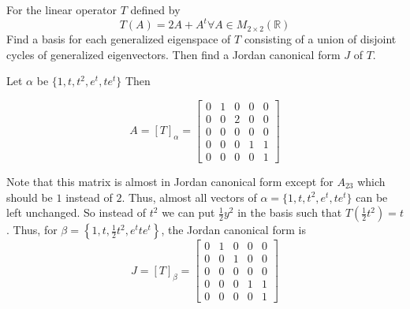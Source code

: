 \begin{homeworkProblem}

For the linear operator $T$ defined by
\[
  T(A) = 2A + A^t \forall A \in M_{2 \times 2}(\mathbb{R})
\]
Find a basis for each generalized eigenspace of $T$ consisting of a union of disjoint cycles of generalized eigenvectors. Then find a Jordan canonical form $J$ of $T$.

\solution

Let $\alpha$ be $\{1, t, t^2, e^t, te^t\}$ Then

\[
  A = [T]_{\alpha} = \begin{bmatrix}
    0 & 1 & 0 & 0 & 0 \\
    0 & 0 & 2 & 0 & 0 \\
    0 & 0 & 0 & 0 & 0 \\
    0 & 0 & 0 & 1 & 1 \\
    0 & 0 & 0 & 0 & 1
  \end{bmatrix}
\]

Note that this matrix is almost in Jordan canonical form except for $A_{23}$ which should be $1$ instead of $2$. Thus, almost all vectors of $\alpha = \{1, t, t^2, e^t, te^t\}$ can be left unchanged. So instead of $t^2$ we can put $\frac{1}{2}y^2$ in the basis such that $T\left(\frac{1}{2}t^2\right) = t$. Thus, for $\beta = \left\{1, t, \frac{1}{2}t^2, e^t te^t\right\}$, the Jordan canonical form is
\[
J = [T]_\beta = \begin{bmatrix}
  0 & 1 & 0 & 0 & 0 \\
  0 & 0 & 1 & 0 & 0 \\
  0 & 0 & 0 & 0 & 0 \\
  0 & 0 & 0 & 1 & 1 \\
  0 & 0 & 0 & 0 & 1
\end{bmatrix}
\]

\end{homeworkProblem}

